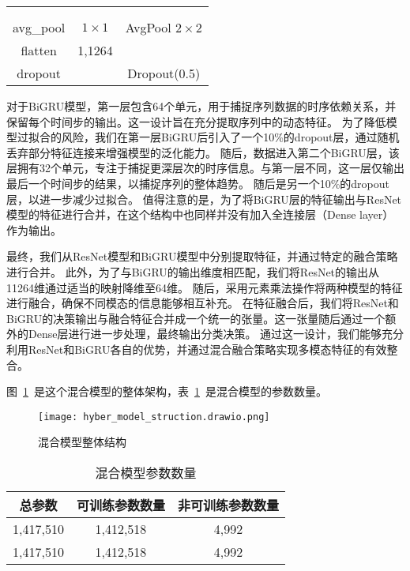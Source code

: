 \begin{table}[h]
\begin{tabular}{c|c|c}
		                          &                                          &                          \\
		                          &                                          &                          \\
		\hline
		avg\_pool                 & $1 \times 1$                             & AvgPool $2 \times 2$     \\
		\hline
		flatten                   & 1,1264                                   &                          \\
		\hline
		dropout                   &                                          & Dropout(0.5)             \\
		\hline
	\end{tabular}
\end{table}


对于BiGRU模型，第一层包含64个单元，用于捕捉序列数据的时序依赖关系，并保留每个时间步的输出。这一设计旨在充分提取序列中的动态特征。
为了降低模型过拟合的风险，我们在第一层BiGRU后引入了一个10\%的dropout层，通过随机丢弃部分特征连接来增强模型的泛化能力。
随后，数据进入第二个BiGRU层，该层拥有32个单元，专注于捕捉更深层次的时序信息。与第一层不同，这一层仅输出最后一个时间步的结果，以捕捉序列的整体趋势。
随后是另一个10\%的dropout层，以进一步减少过拟合。
值得注意的是，为了将BiGRU层的特征输出与ResNet模型的特征进行合并，在这个结构中也同样并没有加入全连接层（Dense layer）作为输出。\par


最终，我们从ResNet模型和BiGRU模型中分别提取特征，并通过特定的融合策略进行合并。
此外，为了与BiGRU的输出维度相匹配，我们将ResNet的输出从11264维通过适当的映射降维至64维。
随后，采用元素乘法操作将两种模型的特征进行融合，确保不同模态的信息能够相互补充。
在特征融合后，我们将ResNet和BiGRU的决策输出与融合特征合并成一个统一的张量。这一张量随后通过一个额外的Dense层进行进一步处理，最终输出分类决策。
通过这一设计，我们能够充分利用ResNet和BiGRU各自的优势，并通过混合融合策略实现多模态特征的有效整合。

图~\ref{fig:hyber_model_struct}~是这个混合模型的整体架构，表~\ref{tab:model_params}~是混合模型的参数数量。
\begin{figure}[h]
	\centering
	\texttt{[image: hyber\_model\_struction.drawio.png]}
	\caption{混合模型整体结构}
	\label{fig:hyber_model_struct}
\end{figure}



\begin{table}[h]
	\caption{混合模型参数数量}
	\label{tab:model_params}
	\centering
	\begin{tabular}{ccc}
		\toprule
		\textbf{总参数} & \textbf{可训练参数数量} & \textbf{非可训练参数数量} \\
		\midrule
		1,417,510       & 1,412,518               & 4,992                     \\
		1,417,510       & 1,412,518               & 4,992                     \\
		\bottomrule
	\end{tabular}
\end{table}
